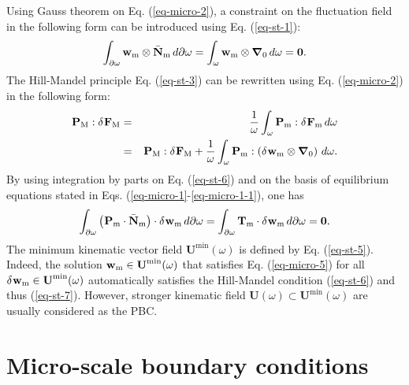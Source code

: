 Using Gauss theorem on Eq. (\ref{eq-micro-2}), a constraint on the fluctuation field in the following form can be introduced using Eq. (\ref{eq-st-1}):
\begin{equation}\label{eq-st-5}
\int_{\partial\omega}^{}\textbf{w}_\text{m}\otimes\bar{\textbf{N}}_\text{m}\,d\partial\omega=\int_\omega^{}\textbf{w}_\text{m}\otimes\bm\nabla_0\,d\omega=\bm{0}.
\end{equation}
The Hill-Mandel principle Eq. (\ref{eq-st-3}) can be rewritten using Eq. (\ref{eq-micro-2}) in the following form:
\begin{eqnarray}\label{eq-st-6}
^{}\textbf{P}_\text{M}:\delta^{}\textbf{F}_\text{M} & = & \frac{1}{\omega}\int_\omega^{}\textbf{P}_\text{m}:\delta^{}\textbf{F}_\text{m}\,d\omega\nonumber\\
& = & ^{}\textbf{P}_\text{M}:\delta^{}\textbf{F}_\text{M}+\frac{1}{\omega}\int_\omega^{}\textbf{P}_\text{m}:\left(\delta^{}\textbf{w}_\text{m}\otimes\bm\nabla_0\right)\,d\omega.
\end{eqnarray}
By using integration by parts on Eq. (\ref{eq-st-6}) and on the basis of equilibrium equations stated in Eqs. (\ref{eq-micro-1}-\ref{eq-micro-1-1}), one has
\begin{equation}\label{eq-st-7}
\int_{\partial\omega}\left(^{}\textbf{P}_\text{m}\cdot\bar{\textbf{N}}_\text{m}\right)\cdot\delta^{}\textbf{w}_\text{m}\,d\partial\omega=\int_{\partial\omega}^{}\textbf{T}_\text{m}\cdot\delta^{}\textbf{w}_\text{m}\,d\partial\omega=\bm{0}.
\end{equation}
The minimum kinematic vector field $ \textbf{U}^{\min}(\omega) $ is defined by Eq. (\ref{eq-st-5}). Indeed, the solution $ ^{}\textbf{w}_\text{m}\in\textbf{U}^{\min}(\omega) $ that satisfies Eq. (\ref{eq-micro-5}) for all $ \delta^{}\textbf{w}_\text{m}\in\textbf{U}^{\min}(\omega) $ automatically satisfies the Hill-Mandel condition (\ref{eq-st-6}) and thus (\ref{eq-st-7}). However, stronger kinematic field $ \textbf{U}(\omega)\subset\textbf{U}^{\min}(\omega) $ are usually considered as the PBC.

\section{Micro-scale boundary conditions}\label{ch-periodic}

